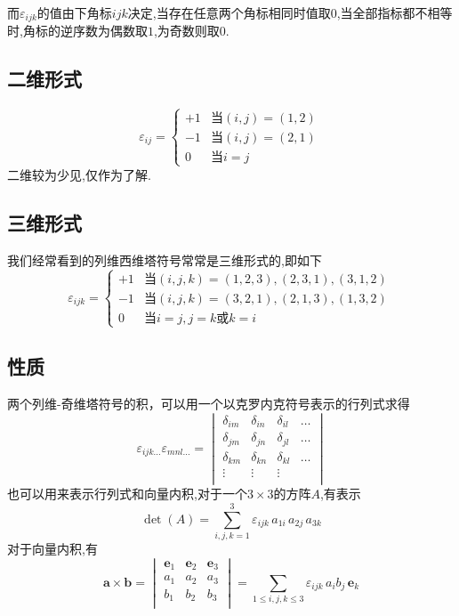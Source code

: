 而$\varepsilon_{ijk}$的值由下角标$ijk$决定,当存在任意两个角标相同时值取$0$,当全部指标都不相等时,角标的逆序数为偶数取$1$,为奇数则取$0$.
\subsection*{二维形式}
\begin{equation}
	\varepsilon_{ij}={
		\begin{cases}+1&\text{当}\left(i,j\right)=\left(1,2\right)\\
			-1&\text{当}\left(i,j\right)=\left(2,1\right)\\
			0&\text{当}i=j
		\end{cases}
	}\,
\end{equation}
二维较为少见,仅作为了解.
\subsection*{三维形式}
我们经常看到的列维西维塔符号常常是三维形式的,即如下
\begin{equation}
	\varepsilon _{ijk}={
		\begin{cases}
			+1&\text{当}(i,j,k)=(1,2,3),(2,3,1),(3,1,2)\\
			-1&\text{当}(i,j,k)=(3,2,1),(2,1,3),(1,3,2)\\
			0&\text{当}i=j,j=k\text{或}k=i
		\end{cases}
	}\,
\end{equation}
\subsection*{性质}
两个列维-奇维塔符号的积，可以用一个以克罗内克符号表示的行列式求得
\begin{equation}
	\varepsilon _{ijk\dots }\varepsilon _{mnl\dots }={\begin{vmatrix}\delta _{im}&\delta _{in}&\delta _{il}&\dots \\\delta _{jm}&\delta _{jn}&\delta _{jl}&\dots \\\delta _{km}&\delta _{kn}&\delta _{kl}&\dots \\\vdots &\vdots &\vdots \\\end{vmatrix}}
\end{equation}
也可以用来表示行列式和向量内积,对于一个$3\times3$的方阵$A$,有表示
\begin{equation}
	\det(A)=\sum _{i,j,k=1}^{3}\varepsilon _{ijk}\,a_{1i}\,a_{2j}\,a_{3k}
\end{equation}
对于向量内积,有
\begin{equation}
	{\boldsymbol {a}}\times {\boldsymbol {b}}={\begin{vmatrix}{\boldsymbol {e}}_{1}&{\boldsymbol {e}}_{2}&{\boldsymbol {e}}_{3}\\a_{1}&a_{2}&a_{3}\\b_{1}&b_{2}&b_{3}\\\end{vmatrix}}=\sum _{1\leq i,j,k\leq 3}\varepsilon _{ijk}\,a_{i}b_{j}\,{\boldsymbol {e}}_{k}
\end{equation}
